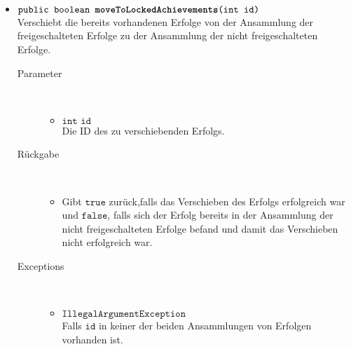 \begin{description}
\begin{itemize}
		\item $\texttt{public boolean \textbf{moveToLockedAchievements}(int id)}$ \\ Verschiebt die bereits vorhandenen Erfolge von der Ansammlung der freigeschalteten Erfolge zu der Ansammlung der nicht freigeschalteten Erfolge.
				\begin{description}
					\item[Parameter] \hfill \\
					\vspace{-.8cm}
					\begin{itemize}
						\item $\texttt{int id}$ \\ Die ID des zu verschiebenden Erfolgs.
					\end{itemize}
					\item[Rückgabe] \hfill \\
					\vspace{-.8cm}
					\begin{itemize}
						\item Gibt $\texttt{true}$ zurück,falls das Verschieben des Erfolgs erfolgreich war und $\texttt{false}$, falls sich der Erfolg bereits in der Ansammlung der nicht freigeschalteten Erfolge befand und damit das Verschieben nicht erfolgreich war.
					\end{itemize}
					\item[Exceptions] \hfill \\
					\vspace{-.8cm}
					\begin{itemize}
						\item $\texttt{IllegalArgumentException}$ \\ Falls $\texttt{id}$ in keiner der beiden Ansammlungen von Erfolgen vorhanden ist.
					\end{itemize}
				\end{description}	
			\end{itemize}
		\end{description}